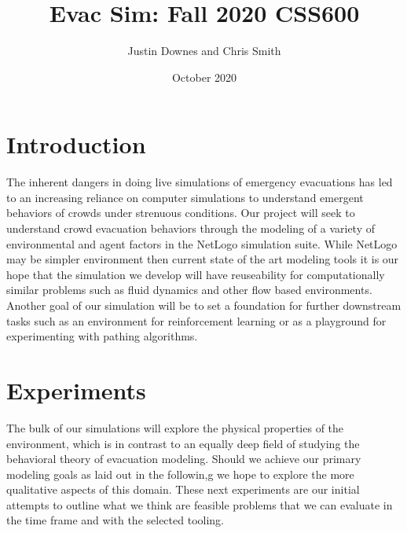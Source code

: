 \documentclass[12pt,letterpaper]{article}
\begin{document}
\title{\vspace{-4cm}Evac Sim: Fall 2020 CSS600 }

\author{Justin Downes and Chris Smith}
\date{October 2020}
\maketitle

\section {Introduction}

The inherent dangers in doing live simulations of emergency evacuations has led to an increasing reliance on computer simulations to understand emergent behaviors of crowds under strenuous conditions\cite{almeidaCrowdSimulationModeling2013}.  Our project will seek to understand crowd evacuation behaviors through the modeling of a variety of environmental and agent factors in the NetLogo simulation suite. While NetLogo may be simpler environment then current state of the art modeling tools it is our hope that the simulation we develop will have reuseability for computationally similar problems such as fluid dynamics and other flow based environments. Another goal of our simulation will be to set a foundation for further downstream tasks such as an environment for reinforcement learning or as a playground for experimenting with pathing algorithms.

\section {Experiments}
The bulk of our simulations will explore the physical properties of the environment, which is in contrast to an equally deep field of studying the behavioral theory of evacuation modeling\cite{kuligowskil}.  Should we achieve our primary modeling goals as laid out in the followin,g we hope to explore the more qualitative aspects of this domain. These next experiments are our initial attempts to outline what we think are feasible problems that we can evaluate in the time frame and with the selected tooling.
\end{document}

